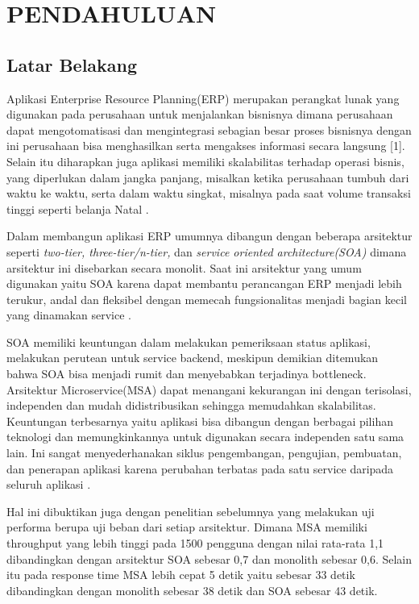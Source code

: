 \chapter{PENDAHULUAN}
\section{Latar Belakang}
Aplikasi Enterprise Resource Planning(ERP) merupakan perangkat lunak yang digunakan pada perusahaan untuk menjalankan bisnisnya dimana perusahaan dapat mengotomatisasi dan mengintegrasi sebagian besar proses bisnisnya dengan ini perusahaan bisa menghasilkan serta mengakses informasi secara langsung [1]. Selain itu diharapkan juga aplikasi memiliki skalabilitas terhadap operasi bisnis, yang diperlukan dalam jangka panjang, misalkan ketika perusahaan tumbuh dari waktu ke waktu, serta dalam waktu singkat, misalnya pada saat volume transaksi tinggi seperti belanja Natal \cite{1}.

Dalam membangun aplikasi ERP umumnya dibangun dengan beberapa arsitektur seperti \textit{ two-tier, three-tier/n-tier,} dan \textit{service oriented architecture(SOA)} dimana arsitektur ini disebarkan secara monolit. Saat ini arsitektur yang umum digunakan yaitu SOA karena dapat membantu perancangan ERP menjadi lebih terukur, andal dan fleksibel dengan memecah fungsionalitas menjadi bagian kecil yang dinamakan service \cite{1}.

SOA memiliki keuntungan dalam melakukan pemeriksaan status aplikasi, melakukan perutean untuk service backend, meskipun demikian ditemukan bahwa SOA bisa menjadi rumit dan menyebabkan terjadinya bottleneck. Arsitektur Microservice(MSA) dapat menangani kekurangan ini dengan terisolasi, independen dan mudah didistribusikan sehingga memudahkan skalabilitas. Keuntungan terbesarnya yaitu aplikasi bisa dibangun dengan berbagai pilihan teknologi dan memungkinkannya untuk digunakan secara independen satu sama lain. Ini sangat menyederhanakan siklus pengembangan, pengujian, pembuatan, dan penerapan aplikasi karena perubahan terbatas pada satu service daripada seluruh aplikasi \cite{3}.

Hal ini dibuktikan juga dengan penelitian sebelumnya yang melakukan uji performa berupa uji beban dari setiap arsitektur. Dimana MSA memiliki throughput yang lebih tinggi pada 1500 pengguna dengan nilai rata-rata 1,1 dibandingkan dengan arsitektur SOA sebesar 0,7 dan monolith sebesar 0,6. Selain itu pada response time MSA lebih cepat 5 detik yaitu sebesar 33 detik dibandingkan dengan monolith sebesar 38 detik dan SOA sebesar 43 detik.

